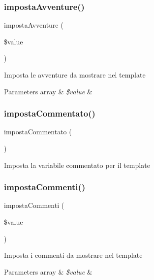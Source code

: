 \subsubsection{\texorpdfstring{imposta\+Avventure()}{impostaAvventure()}}
{\footnotesize\ttfamily imposta\+Avventure (\begin{DoxyParamCaption}\item[{}]{\$value }\end{DoxyParamCaption})}

Imposta le avventure da mostrare nel template


\begin{DoxyParams}[1]{Parameters}
array & {\em \$value} & \\
\hline
\end{DoxyParams}
\mbox{\label{class_v_ricerca_ae9e869a3b6923a4f044dbb4e16c41ff3}} 
\subsubsection{\texorpdfstring{imposta\+Commentato()}{impostaCommentato()}}
{\footnotesize\ttfamily imposta\+Commentato (\begin{DoxyParamCaption}{ }\end{DoxyParamCaption})}

Imposta la variabile commentato per il template \mbox{\label{class_v_ricerca_af9ae17e04de66b81a9f3590989e13234}} 
\subsubsection{\texorpdfstring{imposta\+Commenti()}{impostaCommenti()}}
{\footnotesize\ttfamily imposta\+Commenti (\begin{DoxyParamCaption}\item[{}]{\$value }\end{DoxyParamCaption})}

Imposta i commenti da mostrare nel template


\begin{DoxyParams}[1]{Parameters}
array & {\em \$value} & \\
\hline
\end{DoxyParams}
\mbox{\label{class_v_ricerca_ab3c0dc76f35667b7a13404d03b7fdb36}} 

